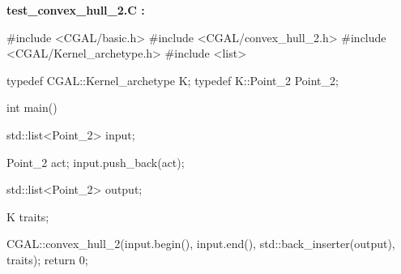 {\bf test\_convex\_hull\_2.C :}

\begin{ccExampleCode}
#include <CGAL/basic.h>
#include <CGAL/convex_hull_2.h>
#include <CGAL/Kernel_archetype.h>
#include <list>

typedef CGAL::Kernel_archetype      K;
typedef K::Point_2                  Point_2;

int main()
{
  std::list<Point_2> input;
  
  Point_2 act;
  input.push_back(act);

  std::list<Point_2> output;

  K  traits;

  CGAL::convex_hull_2(input.begin(), input.end(),
                      std::back_inserter(output), traits);		        
  return 0;
}
\end{ccExampleCode}

\ccHtmlLinksOn


